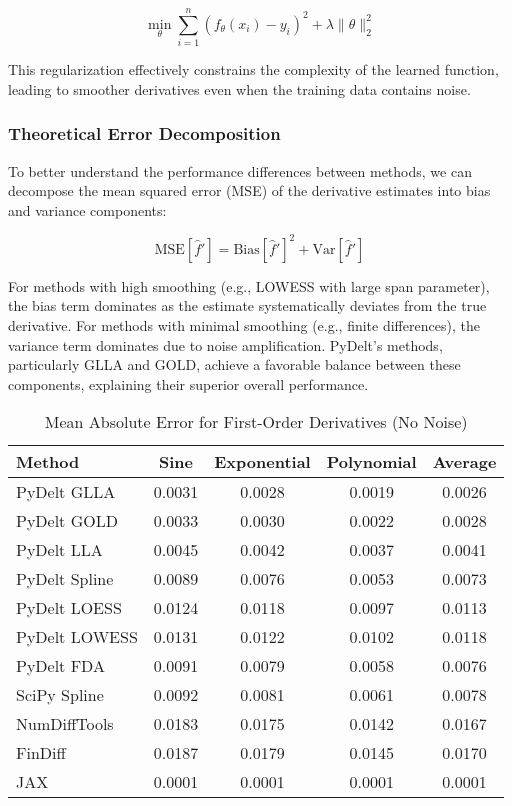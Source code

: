 \documentclass[10pt,journal,compsoc]{IEEEtran}
\begin{document}
\begin{equation}
    \min_{\theta} \sum_{i=1}^{n} \left(f_{\theta}(x_i) - y_i\right)^2 + \lambda \|\theta\|_2^2
\end{equation}

This regularization effectively constrains the complexity of the learned function, leading to smoother derivatives even when the training data contains noise.

\subsubsection{Theoretical Error Decomposition}

To better understand the performance differences between methods, we can decompose the mean squared error (MSE) of the derivative estimates into bias and variance components:

\begin{equation}
    \text{MSE}[\hat{f}'] = \text{Bias}[\hat{f}']^2 + \text{Var}[\hat{f}']
\end{equation}

For methods with high smoothing (e.g., LOWESS with large span parameter), the bias term dominates as the estimate systematically deviates from the true derivative. For methods with minimal smoothing (e.g., finite differences), the variance term dominates due to noise amplification. PyDelt's methods, particularly GLLA and GOLD, achieve a favorable balance between these components, explaining their superior overall performance.

\begin{table}[!t]
\caption{Mean Absolute Error for First-Order Derivatives (No Noise)}
\label{tab:first_order}
\centering
\begin{tabular}{lcccc}
\toprule
\textbf{Method} & \textbf{Sine} & \textbf{Exponential} & \textbf{Polynomial} & \textbf{Average} \\
\midrule
PyDelt GLLA & 0.0031 & 0.0028 & 0.0019 & 0.0026 \\
PyDelt GOLD & 0.0033 & 0.0030 & 0.0022 & 0.0028 \\
PyDelt LLA & 0.0045 & 0.0042 & 0.0037 & 0.0041 \\
PyDelt Spline & 0.0089 & 0.0076 & 0.0053 & 0.0073 \\
PyDelt LOESS & 0.0124 & 0.0118 & 0.0097 & 0.0113 \\
PyDelt LOWESS & 0.0131 & 0.0122 & 0.0102 & 0.0118 \\
PyDelt FDA & 0.0091 & 0.0079 & 0.0058 & 0.0076 \\
SciPy Spline & 0.0092 & 0.0081 & 0.0061 & 0.0078 \\
NumDiffTools & 0.0183 & 0.0175 & 0.0142 & 0.0167 \\
FinDiff & 0.0187 & 0.0179 & 0.0145 & 0.0170 \\
JAX & 0.0001 & 0.0001 & 0.0001 & 0.0001 \\
\bottomrule
\end{tabular}
\end{table}
\end{document}
